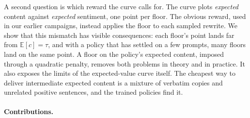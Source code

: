 A second question is which reward the curve calls for. The curve plots
\emph{expected} content against \emph{expected} sentiment, one point per floor.
The obvious reward, used in our earlier campaigns, instead applies the floor to
each sampled rewrite. We show that this mismatch has visible consequences:
each floor's point lands far from $\mathbb{E}[c] = \tau$, and with a policy that
has settled on a few prompts, many floors land on the same point. A floor on
the policy's expected content, imposed through a quadratic penalty, removes
both problems in theory and in practice. It also exposes the limits of the
expected-value curve itself. The cheapest way to deliver intermediate expected
content is a mixture of verbatim copies and unrelated positive sentences, and
the trained policies find it.

\paragraph{Contributions.}
